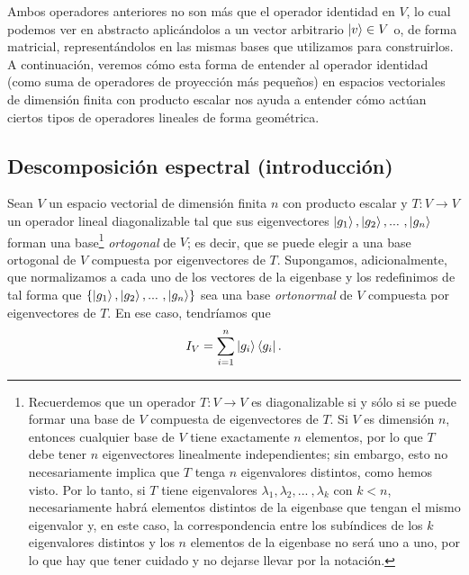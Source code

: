 \documentclass[12pt,libertine]{book}
\begin{document}
\vspace{3mm}
Ambos operadores anteriores no son más que el operador identidad en $V$, lo cual podemos ver en abstracto aplicándolos a un vector arbitrario $\ket{v}\in V$ o, de forma matricial, representándolos en las mismas bases que utilizamos para construirlos. A continuación, veremos cómo esta forma de entender al operador identidad (como suma de operadores de proyección más pequeños) en espacios vectoriales de dimensión finita con producto escalar nos ayuda a entender cómo actúan ciertos tipos de operadores lineales de forma geométrica. 

\subsection*{Descomposición espectral (introducción)} \label{Subsec:Descomposición espectral (introducción)}

Sean $V$ un espacio vectorial de dimensión finita $n$ con producto escalar y $T:V\to V$ un operador lineal diagonalizable tal que sus eigenvectores $\ket{g_1},\ket{g_2},... \ ,\ket{g_n}$ forman una base\footnote{Recuerdemos que un operador $T:V\to V$ es diagonalizable si y sólo si se puede formar una base de $V$ compuesta de eigenvectores de $T$. Si $V$ es dimensión $n$, entonces cualquier base de $V$ tiene exactamente $n$ elementos, por lo que $T$ debe tener $n$ eigenvectores linealmente independientes; sin embargo, esto no necesariamente implica que $T$ tenga $n$ eigenvalores distintos, como hemos visto. Por lo tanto, si $T$ tiene eigenvalores $\lambda_1,\lambda_2,... \ ,\lambda_k$ con $k<n$, necesariamente habrá elementos distintos de la eigenbase que tengan el mismo eigenvalor y, en este caso, la correspondencia entre los subíndices de los $k$ eigenvalores distintos y los $n$ elementos de la eigenbase no será uno a uno, por lo que hay que tener cuidado y no dejarse llevar por la notación.} \emph{ortogonal} de $V$; es decir, que se puede elegir a una base ortogonal de $V$ compuesta por eigenvectores de $T$. Supongamos, adicionalmente, que normalizamos a cada uno de los vectores de la eigenbase y los redefinimos de tal forma que $\{\ket{g_1},\ket{g_2},... \ ,\ket{g_n}\}$ sea una base \emph{ortonormal} de $V$ compuesta por eigenvectores de $T$. En ese caso, tendríamos que \[
    I_V = \sum_{i=1}^n \ket{g_i}\bra{g_i}.
\] 
\end{document}

